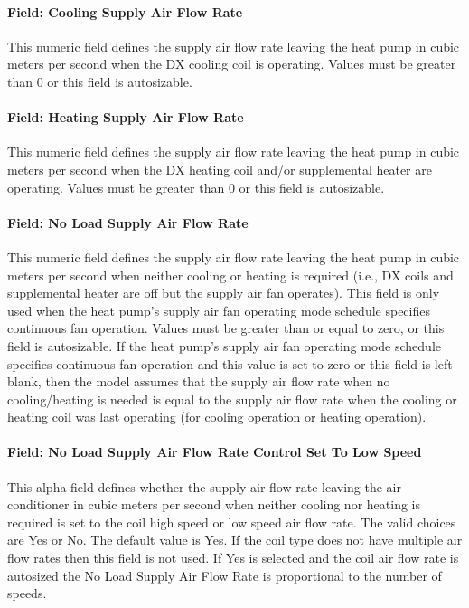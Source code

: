 \paragraph{Field: Cooling Supply Air Flow Rate}\label{field-cooling-supply-air-flow-rate-2-001}

This numeric field defines the supply air flow rate leaving the heat pump in cubic meters per second when the DX cooling coil is operating. Values must be greater than 0 or this field is autosizable.

\paragraph{Field: Heating Supply Air Flow Rate}\label{field-heating-supply-air-flow-rate-2-001}

This numeric field defines the supply air flow rate leaving the heat pump in cubic meters per second when the DX heating coil and/or supplemental heater are operating. Values must be greater than 0 or this field is autosizable.

\paragraph{Field: No Load Supply Air Flow Rate}\label{field-no-load-supply-air-flow-rate-2-001}

This numeric field defines the supply air flow rate leaving the heat pump in cubic meters per second when neither cooling or heating is required (i.e., DX coils and supplemental heater are off but the supply air fan operates). This field is only used when the heat pump's supply air fan operating mode schedule specifies continuous fan operation. Values must be greater than or equal to zero, or this field is autosizable. If the heat pump's supply air fan operating mode schedule specifies continuous fan operation and this value is set to zero or this field is left blank, then the model assumes that the supply air flow rate when no cooling/heating is needed is equal to the supply air flow rate when the cooling or heating coil was last operating (for cooling operation or heating operation).

\paragraph{Field: No Load Supply Air Flow Rate Control Set To Low Speed}\label{field-no-load-supply-air-flow-rate-control-set-to-low-speed-003}

This alpha field defines whether the supply air flow rate leaving the air conditioner in cubic meters per second when neither cooling nor heating is required is set to the coil high speed or low speed air flow rate. The valid choices are Yes or No. The default value is Yes. If the coil type does not have multiple air flow rates then this field is not used. If Yes is selected and the coil air flow rate is autosized the No Load Supply Air Flow Rate is proportional to the number of speeds.

